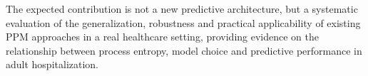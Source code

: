 The expected contribution is not a new predictive architecture, but a systematic evaluation of the generalization, robustness and practical applicability of existing PPM approaches in a real healthcare setting, providing evidence on the relationship between process entropy, model choice and predictive performance in adult hospitalization.
